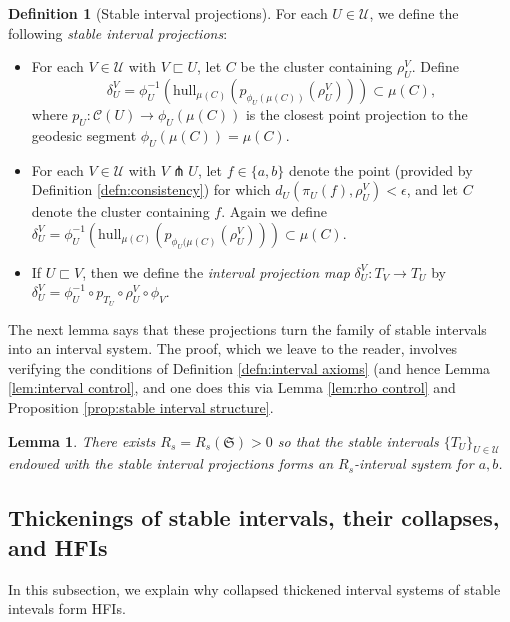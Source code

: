 \documentclass{amsart}
\newtheorem{lemma}[theorem]{Lemma}
\theoremstyle{definition}
\newtheorem{definition}[theorem]{Definition}
\theoremstyle{remark}
\theoremstyle{definition}
\newcommand{\calC}{\mathcal{C}}
\newcommand{\calU}{\mathcal{U}}
\newcommand{\hull}{\mathrm{hull}}
\newcommand{\nest}{\sqsubset}
\begin{document}
\begin{definition}[Stable interval projections]\label{defn:stable interval projections}
For each $U \in \calU$, we define the following \emph{stable interval projections}:
\begin{itemize}
\item For each $V \in \calU$ with $V \nest U$, let $C$ be the cluster containing $\rho^V_U$.  Define 
$$\delta^V_U = \phi_U^{-1}(\hull_{\mu(C)}(p_{\phi_U(\mu(C))}(\rho^V_U))) \subset \mu(C),$$where $p_U:\calC(U) \to \phi_U(\mu(C))$ is the closest point projection to the geodesic segment $\phi_U(\mu(C)) = \mu(C)$.
\item For each $V \in \calU$ with $V \pitchfork U$, let $f \in \{a,b\}$ denote the point (provided by Definition \ref{defn:consistency}) for which $d_U(\pi_U(f), \rho^V_U)<\epsilon$, and let $C$ denote the cluster containing $f$.  Again we define $\delta^V_U = \phi_U^{-1}(\hull_{\mu(C)}(p_{\phi_U(\mu(C)}(\rho^V_U))) \subset \mu(C)$.
\item If $U \nest V$, then we define the \emph{interval projection map} $\delta^V_U:T_V \to T_U$ by $\delta^V_U = \phi^{-1}_U \circ p_{T_U} \circ \rho^V_U \circ \phi_V.$
\end{itemize}
\end{definition}

The next lemma says that these projections turn the family of stable intervals into an interval system.  The proof, which we leave to the reader, involves verifying the conditions of Definition \ref{defn:interval axioms} (and hence Lemma \ref{lem:interval control}, and one does this via Lemma \ref{lem:rho control} and Proposition \ref{prop:stable interval structure}.

\begin{lemma}\label{lem:stable interval system}
There exists $R_s = R_s(\mathfrak S)>0$ so that the stable intervals $\{T_U\}_{U \in \calU}$ endowed with the stable interval projections forms an $R_s$-interval system for $a,b$.
\end{lemma}



\subsection{Thickenings of stable intervals, their collapses, and HFIs}\label{subsec:collapsed stable intervals}

In this subsection, we explain why collapsed thickened interval systems of stable intevals form HFIs.
\end{document}
